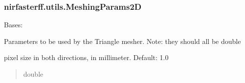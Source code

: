 \documentclass[letterpaper,10pt,english]{sphinxmanual}
\begin{document}
\sphinxstepscope


\subsubsection{nirfasterff.utils.MeshingParams2D}
\label{\detokenize{_autosummary/nirfasterff.utils.MeshingParams2D:nirfasterff-utils-meshingparams2d}}\label{\detokenize{_autosummary/nirfasterff.utils.MeshingParams2D::doc}}

\begin{fulllineitems}
\label{\detokenize{_autosummary/nirfasterff.utils.MeshingParams2D:nirfasterff.utils.MeshingParams2D}}
\pysigstartsignatures
{}
\pysigstopsignatures
\sphinxAtStartPar
Bases: 

\sphinxAtStartPar
Parameters to be used by the Triangle mesher. Note: they should all be double

\begin{fulllineitems}
\label{\detokenize{_autosummary/nirfasterff.utils.MeshingParams2D:nirfasterff.utils.MeshingParams2D.mm_per_pixel}}
\pysigstartsignatures
{}
\pysigstopsignatures
\sphinxAtStartPar
pixel size in both directions, in millimeter. Default: 1.0
\begin{quote}\begin{description}
\sphinxAtStartPar
double

\end{description}\end{quote}

\end{fulllineitems}



\end{fulllineitems}
\end{document}
